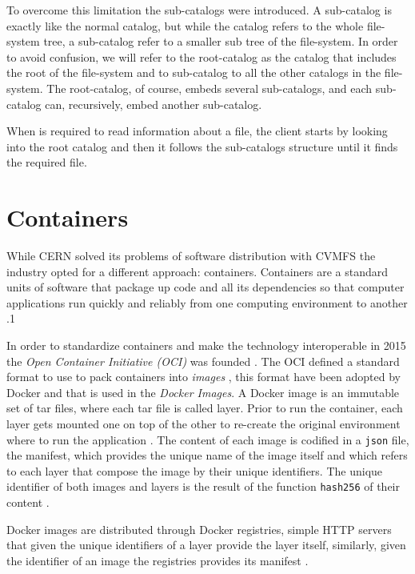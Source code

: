 To overcome this limitation the sub-catalogs were introduced.
A sub-catalog is exactly like the normal catalog, but while the catalog refers
to the whole file-system tree, a sub-catalog refer to a smaller sub tree of the
file-system. In order to avoid confusion, we will refer to the root-catalog as
the catalog that includes the root of the file-system and to sub-catalog to all
the other catalogs in the file-system. The root-catalog, of course, embeds
several sub-catalogs, and each sub-catalog can, recursively, embed another
sub-catalog.

When is required to read information about a file, the client starts by looking
into the root catalog and then it follows the sub-catalogs structure until it 
finds the required file.

\section{Containers}
\label{sec:containers}

While CERN solved its problems of software distribution with CVMFS the industry
opted for a different approach: containers. 
Containers are a standard units of software that package up code and all its
dependencies so that computer applications run quickly and reliably from one
computing environment to another \cite{docker:what}.1

In order to standardize containers and make the technology interoperable in
2015 the \textit{Open Container Initiative (OCI)} was founded \cite{oci}. The
OCI defined a standard format to use to pack containers into \textit{images}
\cite{oci-image-spec}, this format have been adopted by Docker and that is used
in the \textit{Docker Images}.
A Docker image is an immutable
set of tar files, where each tar file is called layer. Prior to run the container,
each layer gets mounted one on top of the other to re-create the original
environment where to run the application \cite{oci:image-filesystem}. The
content of each image is codified in a \texttt{json} file, the manifest, which
provides the unique name of the image itself and which refers to each layer that
compose the image by their unique identifiers. The unique identifier of both
images and layers is the result of the function \texttt{hash256} of their
content \cite{oci:content}. 

Docker images are distributed through Docker registries, simple HTTP servers
that given the unique identifiers of a layer provide the layer itself,
similarly, given the identifier of an image the registries provides its
manifest \cite{docker:registry}.


